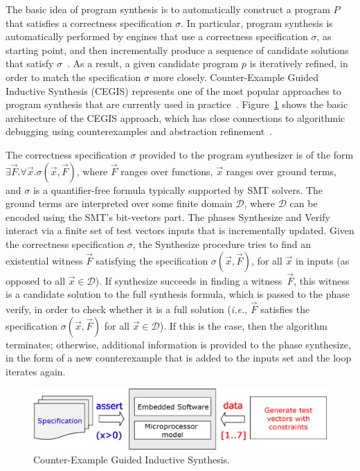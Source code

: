 \documentclass[format=acmsmall, review=false, screen=true]{acmart}
\begin{document}
The basic idea of program synthesis is to automatically construct a program $P$ that satisfies a correctness specification $\sigma$. In particular, program synthesis is automatically performed by engines that use a correctness specification $\sigma$, as starting point, and then incrementally produce a sequence of candidate solutions that satisfy $\sigma$~\cite{Abate17}. As a result, a given candidate program $p$ is iteratively refined, in order to match the specification $\sigma$ more closely. Counter-Example Guided Inductive Synthesis (CEGIS) represents one of the most popular approaches to program synthesis that are currently used in practice~\cite{David15}. Figure~\ref{Counter-Example-Guided-Inductive-Synthesis} shows the basic architecture of the CEGIS approach, which has close connections to algorithmic debugging using counterexamples and abstraction refinement~\cite{Alur13}. 

The correctness specification $\sigma$ provided to the program synthesizer is of the form $\exists \vec{F} .  \forall \vec{x}.  \sigma(\vec{x}, \vec{F})$, where $\vec{F}$ ranges over functions, $\vec{x}$ ranges over ground terms, and $\sigma$ is a quantifier-free formula typically supported by SMT solvers. The ground terms are interpreted over some finite domain $\mathcal{D}$, where $\mathcal{D}$ can be encoded using the SMT's bit-vectors part. The phases {\sc Synthesize} and {\sc Verify} interact via a finite set of test vectors {\sc inputs} that is incrementally updated. Given the correctness specification $\sigma$, the {\sc Synthesize} procedure tries to find an existential witness $\vec{F}$ satisfying the specification $\sigma(\vec{x}, \vec{F})$, for all $\vec{x}$ in {\sc inputs} (as opposed to all $\vec{x} \in \mathcal{D}$). If {\sc synthesize} succeeds in finding a witness~$\vec{F}$, this witness is a candidate solution to the full synthesis formula, which is passed to the phase {\sc verify}, in order to check whether it is a full solution ({\it i.e.}, $\vec{F}$ satisfies the specification $\sigma(\vec{x}, \vec{F})$ for all $\vec{x}\in\mathcal{D}$). If this is the case, then the algorithm terminates; otherwise, additional information is provided to the phase {\sc synthesize}, in the form of a new counterexample that is added to the {\sc inputs} set and the loop iterates again. 
%
\begin{figure}[h]
	\centering
	\includegraphics[scale=0.12]{figure3.eps}
	\caption{Counter-Example Guided Inductive Synthesis.}
	\label{Counter-Example-Guided-Inductive-Synthesis}
\end{figure}
\end{document}
